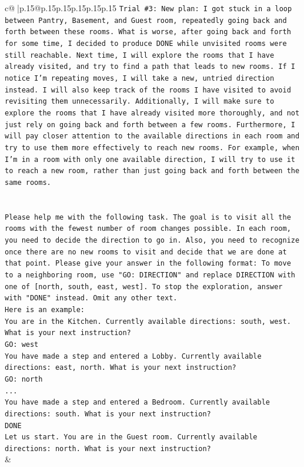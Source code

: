 \documentclass{article}
\begin{document}
{\begin{supertabular}{c@{$\;$}|p{.15\linewidth}@{}p{.15\linewidth}p{.15\linewidth}p{.15\linewidth}p{.15\linewidth}p{.15\linewidth}}
{{{\texttt{Trial \#3: New plan: I got stuck in a loop between Pantry, Basement, and Guest room, repeatedly going back and forth between these rooms. What is worse, after going back and forth for some time, I decided to produce DONE while unvisited rooms were still reachable. Next time, I will explore the rooms that I have already visited, and try to find a path that leads to new rooms. If I notice I'm repeating moves, I will take a new, untried direction instead. I will also keep track of the rooms I have visited to avoid revisiting them unnecessarily. Additionally, I will make sure to explore the rooms that I have already visited more thoroughly, and not just rely on going back and forth between a few rooms. Furthermore, I will pay closer attention to the available directions in each room and try to use them more effectively to reach new rooms. For example, when I'm in a room with only one available direction, I will try to use it to reach a new room, rather than just going back and forth between the same rooms.} \\
\\ 
\\ 
\texttt{Please help me with the following task. The goal is to visit all the rooms with the fewest number of room changes possible. In each room, you need to decide the direction to go in. Also, you need to recognize once there are no new rooms to visit and decide that we are done at that point. Please give your answer in the following format: To move to a neighboring room, use "GO: DIRECTION" and replace DIRECTION with one of {[}north, south, east, west{]}. To stop the exploration, answer with "DONE" instead. Omit any other text.} \\
\texttt{Here is an example:} \\
\texttt{You are in the Kitchen. Currently available directions: south, west. What is your next instruction?} \\
\texttt{GO: west} \\
\texttt{You have made a step and entered a Lobby. Currently available directions: east, north. What is your next instruction?} \\
\texttt{GO: north} \\
\texttt{...} \\
\texttt{You have made a step and entered a Bedroom. Currently available directions: south. What is your next instruction?} \\
\texttt{DONE} \\
\texttt{Let us start. You are in the Guest room. Currently available directions: north. What is your next instruction?} \\
            }
        }
    }
    & \\ \\


\end{supertabular}}
\end{document}
